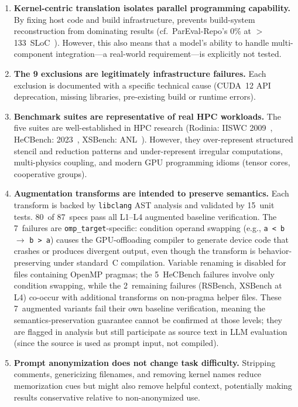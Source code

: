 \begin{enumerate}
      \item \textbf{Kernel-centric translation isolates parallel programming
    capability.} By fixing host code and build infrastructure, \parbench{}
    prevents build-system reconstruction from dominating results (cf.\
    ParEval-Repo's 0\% at $>$133~SLoC~\cite{ParEvalRepo2025}). However, this
    also means that a model's ability to handle multi-component integration---a
    real-world requirement---is explicitly not tested.

  \item \textbf{The 9 \knownfail{} exclusions are legitimately infrastructure
    failures.} Each exclusion is documented with a specific technical cause (CUDA~12 API deprecation, missing libraries, pre-existing build or runtime errors).

  \item \textbf{Benchmark suites are representative of real HPC workloads.}
    The five suites are well-established in HPC research (Rodinia: IISWC
    2009~\cite{Rodinia2009}, HeCBench: 2023~\cite{HeCBench2023}, XSBench:
    ANL~\cite{XSBench2014}). However, they over-represent structured stencil
    and reduction patterns and under-represent irregular computations,
    multi-physics coupling, and modern GPU programming idioms (tensor cores,
    cooperative groups).

    \item \textbf{Augmentation transforms are intended to preserve semantics.} Each transform is backed by \texttt{libclang} AST analysis and validated by 15~unit tests. 80~of 87~specs pass all L1--L4 augmented baseline verification. The 7~failures are \texttt{omp\_target}-specific: condition operand swapping (e.g., \texttt{a < b} $\to$ \texttt{b > a}) causes the GPU-offloading compiler to generate device code that crashes or produces divergent output, even though the transform is behavior-preserving under standard~C compilation. Variable renaming is disabled for files containing OpenMP pragmas; the 5~HeCBench failures involve only condition swapping, while the 2~remaining failures (RSBench, XSBench at L4) co-occur with additional transforms on non-pragma helper files. These 7~augmented variants fail their own baseline verification, meaning the semantics-preservation guarantee cannot be confirmed at those levels; they are flagged in analysis but still participate as source text in LLM evaluation (since the source is used as prompt input, not compiled).
    
    \item \textbf{Prompt anonymization does not change task difficulty.}
    Stripping comments, genericizing filenames, and removing kernel names reduce memorization cues but might also remove helpful context, potentially making \parbench{} results conservative relative to non-anonymized use.
\end{enumerate}

